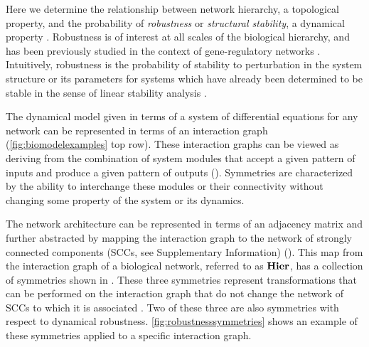 Here we determine the relationship between network hierarchy, a topological property, and the probability of \emph{robustness} or \emph{structural stability}, a dynamical property \cite{Smale1967}. Robustness is of interest at all scales of the biological hierarchy, and has been previously studied in the context of gene-regulatory networks \cite{WADDINGTON1942a,VanNimwegen1999,Siegal2002,Ciliberti2007b,Ciliberti2007,Wagner2013}. Intuitively, robustness is the probability of stability to perturbation in the system structure or its parameters for systems which have already been determined to be stable in the sense of linear stability analysis \cite{Davis1962}.

The dynamical model given in terms of a system of differential equations for any network can be represented in terms of an interaction graph (\ref{fig:biomodelexamples} top row). These interaction graphs can be viewed as deriving from the combination of system modules that accept a given pattern of inputs and produce a given pattern of outputs (). Symmetries are characterized by the ability to interchange these modules or their connectivity without changing some property of the system or its dynamics.

The network architecture can be represented in terms of an adjacency matrix and further abstracted by mapping the interaction graph to the network of strongly connected components (SCCs, see Supplementary Information) (). This map from the interaction graph of a biological network, referred to as $\mathbf{Hier}$, has a collection of symmetries shown in . These three symmetries represent transformations that can be performed on the interaction graph that do not change the network of SCCs to which it is associated . Two of these three are also symmetries with respect to dynamical robustness. \ref{fig:robustnesssymmetries} shows an example of these symmetries applied to a specific interaction graph.


